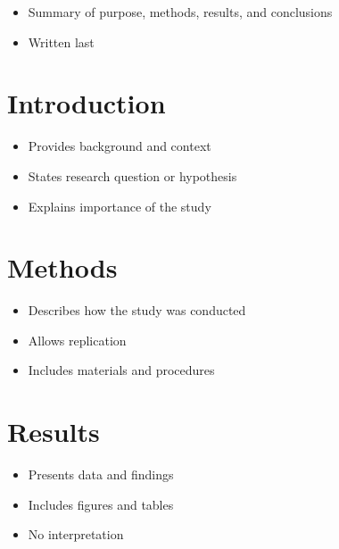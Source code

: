 \documentclass[
  letterpaper,
  DIV=11,
  numbers=noendperiod]{scrreprt}
\begin{document}

\begin{itemize}
\item
  Summary of purpose, methods, results, and conclusions
\item
  Written last
\end{itemize}

\section*{\texorpdfstring{\textbf{Introduction}}{Introduction}}\label{introduction}


\begin{itemize}
\item
  Provides background and context
\item
  States research question or hypothesis
\item
  Explains importance of the study
\end{itemize}

\section*{\texorpdfstring{\textbf{Methods}}{Methods}}\label{methods}


\begin{itemize}
\item
  Describes how the study was conducted
\item
  Allows replication
\item
  Includes materials and procedures
\end{itemize}

\section*{\texorpdfstring{\textbf{Results}}{Results}}\label{results}


\begin{itemize}
\item
  Presents data and findings
\item
  Includes figures and tables
\item
  No interpretation
\end{itemize}
\end{document}
